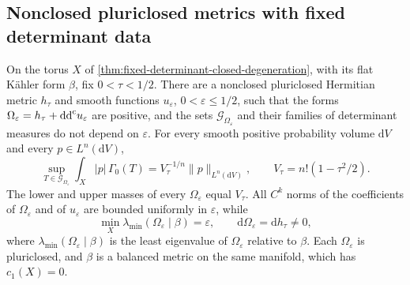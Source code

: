 \subsection{Nonclosed pluriclosed metrics with fixed determinant data}
\begin{theorem}\label{thm:fixed-determinant-nonclosed-degeneration}
On the torus $X$ of \cref{thm:fixed-determinant-closed-degeneration}, with its flat K\"ahler form $\beta$, fix $0<\tau<1/2$. There are a
nonclosed pluriclosed Hermitian metric $h_\tau$ and smooth functions $u_\varepsilon$,
$0<\varepsilon\leq1/2$, such that the forms
$\Omega_\varepsilon=h_\tau+\mathrm{dd}^{\mathrm{c}} u_\varepsilon$ are positive, and the sets $\mathscr G_{\Omega_\varepsilon}$ and their
families of determinant measures do not depend on $\varepsilon$. For every smooth positive
probability volume $\mathrm dV$ and every $p\in L^n(\mathrm dV)$,
\[
 \sup_{T\in\mathscr G_{\Omega_\varepsilon}}
       \int_X|p|\,\Gamma_0(T)
       =V_\tau^{-1/n}\|p\|_{L^n(\mathrm dV)},\qquad
 V_\tau=n!(1-\tau^2/2).
\]
The lower and upper masses of every $\Omega_\varepsilon$ equal $V_\tau$. All $C^k$ norms of the
coefficients of $\Omega_\varepsilon$ and of $u_\varepsilon$ are bounded uniformly in $\varepsilon$, while
\[
 \min_X\lambda_{\min}(\Omega_\varepsilon\mid\beta)=\varepsilon,
 \qquad \mathrm d\Omega_\varepsilon=\mathrm dh_\tau\ne0,
\]
where $\lambda_{\min}(\Omega_\varepsilon\mid\beta)$ is the least eigenvalue of $\Omega_\varepsilon$ relative to $\beta$.
Each $\Omega_\varepsilon$ is pluriclosed, and $\beta$ is a balanced metric on the same manifold,
which has $c_1(X)=0$.
\end{theorem}
